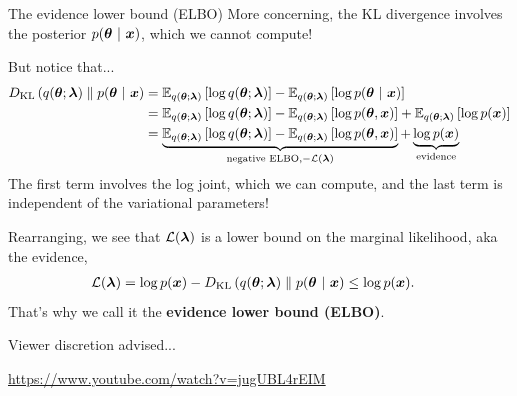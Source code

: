\documentclass[aspectratio=169]{beamer}
\begin{document}
\begin{frame}{The evidence lower bound (ELBO)}
    More concerning, the KL divergence involves the posterior $p(\boldsymbol{\theta} ~\vert~ \boldsymbol{x})$, which we cannot compute!
    
    But notice that...
    \begin{align}
        D_{\textrm{KL}}\left(q(\boldsymbol{\theta}; \boldsymbol{\lambda})\;\|\;p(\boldsymbol{\theta} ~\vert~ \boldsymbol{x}\right)
        &= \mathbb{E}_{q(\boldsymbol{\theta}; \boldsymbol{\lambda})} \left[ \log q(\boldsymbol{\theta}; \boldsymbol{\lambda}) \right] 
        - \mathbb{E}_{q(\boldsymbol{\theta}; \boldsymbol{\lambda})} \left[ \log p(\boldsymbol{\theta} ~\vert~ \boldsymbol{x}) \right] \\
        &= \mathbb{E}_{q(\boldsymbol{\theta}; \boldsymbol{\lambda})} \left[ \log q(\boldsymbol{\theta}; \boldsymbol{\lambda}) \right] 
        - \mathbb{E}_{q(\boldsymbol{\theta}; \boldsymbol{\lambda})} \left[ \log p(\boldsymbol{\theta}, \boldsymbol{x}) \right] 
        + \mathbb{E}_{q(\boldsymbol{\theta}; \boldsymbol{\lambda})}\left[ \log p(\boldsymbol{x})\right] \\
        &= \underbrace{\mathbb{E}_{q(\boldsymbol{\theta}; \boldsymbol{\lambda})} \left[ \log q(\boldsymbol{\theta}; \boldsymbol{\lambda}) \right] 
        - \mathbb{E}_{q(\boldsymbol{\theta}; \boldsymbol{\lambda})} \left[ \log p(\boldsymbol{\theta}, \boldsymbol{x}) \right]}_{\text{negative ELBO}, -\mathcal{L}(\boldsymbol{\lambda})}
        + \underbrace{\log p(\boldsymbol{x})}_{\text{evidence}}
    \end{align}
The first term involves the log joint, which we can compute, and the last term is independent of the variational parameters! 

Rearranging, we see that $\mathcal{L}(\boldsymbol{\lambda})$ is a lower bound on the marginal likelihood, aka the evidence,
\begin{align}
    \mathcal{L}(\boldsymbol{\lambda}) &= \log p(\boldsymbol{x}) - D_{\textrm{KL}}\left(q(\boldsymbol{\theta}; \boldsymbol{\lambda})\;\|\;p(\boldsymbol{\theta} ~\vert~ \boldsymbol{x}\right) 
    \leq \log p(\boldsymbol{x}).
\end{align}
That's why we call it the \textbf{evidence lower bound (ELBO)}.
\end{frame}

\begin{frame}{Viewer discretion advised...}
    
    \centering
    \url{https://www.youtube.com/watch?v=jugUBL4rEIM}
    
\end{frame}
\end{document}

